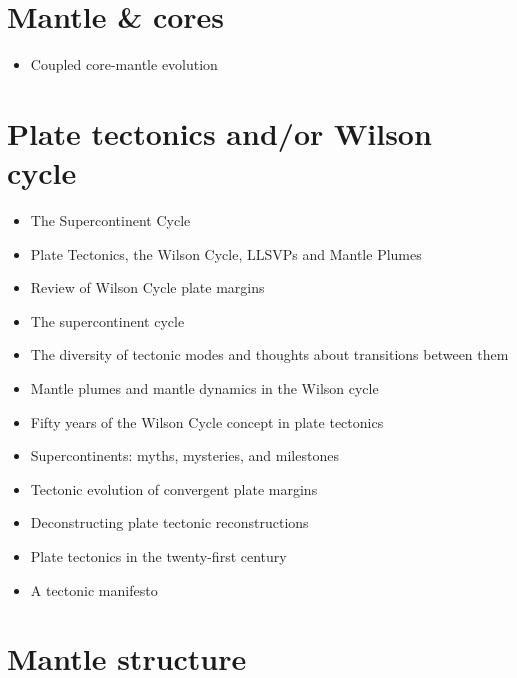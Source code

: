 \section{Mantle \& cores}

   \begin{itemize}
   \item[\twothousandtwenty] Coupled core-mantle evolution \cite{naka20}
   \end{itemize}

\section{Plate tectonics and/or Wilson cycle}

   \begin{itemize}
   \item [\nineteeneightyeight] The Supercontinent Cycle \cite{nawm88}
   \item [\twothousandeleven] Plate Tectonics, the Wilson Cycle, LLSVPs and Mantle Plumes \cite{burk11}
   \item [\twothousandfourteen] Review of Wilson Cycle plate margins \cite{buto14}
   \item [\twothousandfourteen] The supercontinent cycle \cite{nams14}
   \item [\twothousandeighteen] The diversity of tectonic modes and thoughts about transitions between them \cite{lena18}
   \item [\twothousandnineteen] Mantle plumes and mantle dynamics in the Wilson cycle \cite{hero19}
   \item [\twothousandnineteen] Fifty years of the Wilson Cycle concept in plate tectonics \cite{wihb19}
   \item [\twothousandnineteen] Supercontinents: myths, mysteries, and milestones \cite{panm19}
   \item [\twothousandtwentytwo] Tectonic evolution of convergent plate margins \cite{zhcc22} 
   \item [\twothousandtwentythree] Deconstructing plate tectonic reconstructions \cite{sewd23}
   \item [\twothousandtwentythree] Plate tectonics in the twenty-first century \cite{zhen23}
   \item [\twothousandtwentythree] A tectonic manifesto \cite{stgt23}
   \end{itemize}

\section{Mantle structure}

